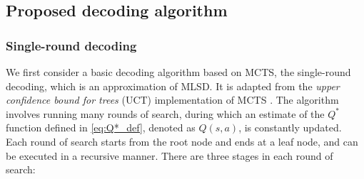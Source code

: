 \documentclass[conference,letterpaper]{IEEEtran}
\begin{document}
\subsection{Proposed decoding algorithm}
\subsubsection{Single-round decoding}
We first consider a basic decoding algorithm based on MCTS, the single-round decoding, which is an approximation of MLSD.
It is adapted from the \emph{upper confidence bound for trees} (UCT) implementation of MCTS \cite{Kocsis06banditbased}.
The algorithm involves running many rounds of search, during which an estimate of the $Q^*$ function defined in \eqref{eq:Q*_def}, denoted as $Q(s,a)$, is constantly updated.
Each round of search starts from the root node and ends at a leaf node, and can be executed in a recursive manner.
There are three stages in each round of search:
\end{document}
